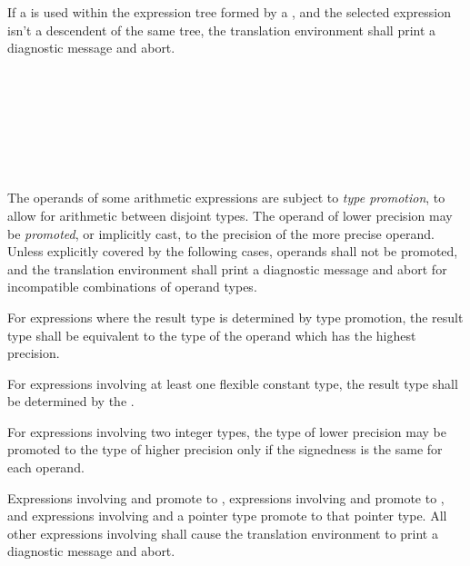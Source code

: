 \specsubsubitem
If a  is used within the expression tree formed
by a , and the selected expression isn't a
descendent of the same tree, the translation environment shall print a
diagnostic message and abort.


\begin{grammar}
 \\
	 \\
	 \\
	 \\
	 \\
	 \\
\end{grammar}


\specsubitem
The operands of some arithmetic expressions are subject to \textit{type
promotion}, to allow for arithmetic between disjoint types. The operand of
lower precision may be \textit{promoted}, or implicitly cast, to the precision
of the more precise operand. Unless explicitly covered by the following cases,
operands shall not be promoted, and the translation environment shall print a
diagnostic message and abort for incompatible combinations of operand types.

\specsubitem
For expressions where the result type is determined by type promotion, the
result type shall be equivalent to the type of the operand which has the
highest precision.

\specsubitem
For expressions involving at least one flexible constant type, the result type
shall be determined by the .

\specsubitem
For expressions involving two integer types, the type of lower precision may be
promoted to the type of higher precision only if the signedness is the same for
each operand.

\specsubitem
Expressions involving  and  promote to
, expressions involving  and 
promote to , and expressions involving  and
a pointer type promote to that pointer type. All other expressions involving
 shall cause the translation environment to print a diagnostic
message and abort.

